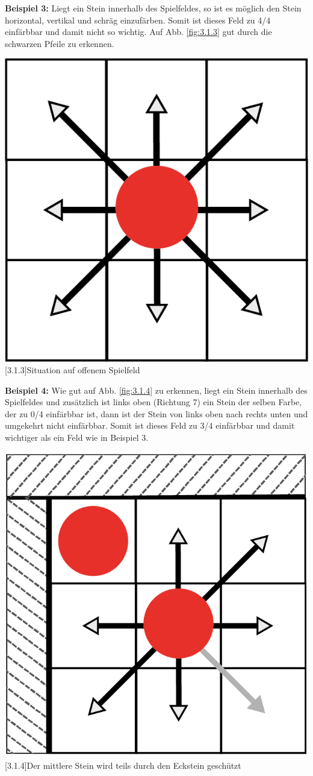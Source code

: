 \documentclass[12pt,a4paper,bibliography=totocnumbered,listof=totocnumbered]{scrartcl}
\begin{document}
    \textbf{Beispiel 3:} Liegt ein Stein innerhalb des Spielfeldes, so ist es möglich den Stein horizontal, vertikal und schräg einzufärben. Somit ist dieses Feld zu 4/4 einfärbbar und damit nicht so wichtig. Auf Abb. \ref{fig:3.1.3} gut durch die schwarzen Pfeile zu erkennen.\newline

   	\vspace{1em}
    \begin{minipage}{\linewidth}
    	\centering
    	\includegraphics[width=0.33\linewidth]{pics/Kapitel_3/Kapitel_3_pic3.png}
    	[3.1.3]{Situation auf offenem Spielfeld}
    	\label{fig:3.1.3}
    \end{minipage}
	\vspace{1em}
	
    \textbf{Beispiel 4:} Wie gut auf Abb. \ref{fig:3.1.4} zu erkennen, liegt ein Stein innerhalb des Spielfeldes und zusätzlich ist links oben (Richtung 7) ein Stein der selben Farbe, der zu 0/4 einfärbbar ist, dann ist der Stein von links oben nach rechts unten und umgekehrt nicht einfärbbar. Somit ist dieses Feld zu 3/4 einfärbbar und damit wichtiger als ein Feld wie in Beispiel 3.\newline

   	\vspace{1em}
    \begin{minipage}{\linewidth}
    	\centering
    	\includegraphics[width=0.33\linewidth]{pics/Kapitel_3/Kapitel_3_pic4.png}
    	[3.1.4]{Der mittlere Stein wird teils durch den Eckstein geschützt}
    	\label{fig:3.1.4}
    \end{minipage}
	\vspace{1em}
	
\end{document}
